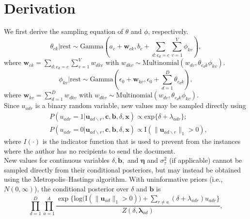 \documentclass[11pt]{article}
\begin{document}
\section{Derivation}
We first derive the sampling equation of $\theta$ and $\phi$, respectively. 
\begin{equation}
\theta_{ck}| \mbox{rest} \sim \mbox{Gamma}(a_c + \boldsymbol{w}_{ck}, b_c + \sum_{d: c_d = c}\sum_{v=1}^V\phi_{kv}),
\end{equation} 
where $\boldsymbol{w}_{ck} = \sum\limits_{d:c_d=c} \sum_{v=1}^V w_{dkv}$ with $w_{dkv} \sim \mbox{Multinomial}(w_{dv}, \theta_{c_dk}\phi_{kv})$.
\begin{equation}
\phi_{kv}| \mbox{rest} \sim \mbox{Gamma}(\epsilon_0 + \boldsymbol{w}_{kv}, \epsilon_0 +\sum_{d=1}^D\theta_{c_dk} ),
\end{equation} 
where $\boldsymbol{w}_{kv} = \sum_{d=1}^D w_{dkv}$ with $w_{dkv} \sim \mbox{Multinomial}(w_{dv}, \theta_{c_dk}\phi_{kv})$.\\ \newline
Since $u_{adr}$ is a binary random variable, new values may be sampled directly using
\begin{equation}
\begin{aligned}
&P(u_{adr}=1| \boldsymbol{u}_{ad\backslash r}, \boldsymbol{c},\boldsymbol{b}, \delta, \boldsymbol{x})
\propto \mbox{exp}\{\delta+\lambda_{adr}\};\\
&P(u_{adr}=0| \boldsymbol{u}_{ad\backslash r}, \boldsymbol{c},\boldsymbol{b}, \delta, \boldsymbol{x})\propto \text{I}(\lVert\boldsymbol{u}_{ad\backslash r}\rVert_1 > 0 ),
\end{aligned}
\label{eqn:latentreceiver}
\end{equation}
where $I(\cdot)$ is the indicator function that is used to prevent from the instances where the author has no recipients to send the document. \\\newline
New values for continuous variables $\delta, \boldsymbol{b},$ and $\boldsymbol{\eta}$ and $\sigma^2_\tau$ (if applicable) cannot be sampled directly from their conditional posteriors, but may instead be obtained using the Metropolis--Hastings algorithm. With uninformative priors (i.e., $N({0},\infty)$), the conditional posterior over $\delta$ and $\boldsymbol{b}$ is
\begin{equation}
\prod_{d=1}^D
\prod_{a=1}^A \frac{\exp\Big\{\mbox{log}\big(\text{I}( \lVert \boldsymbol{u}_{ad}\rVert_1 > 0)\big) + \sum\limits_{r \neq a} (\delta+\lambda_{adr})u_{adr}\Big\}}{Z(\delta,\boldsymbol{\lambda}_{ad})},
\end{equation}
\end{document}
